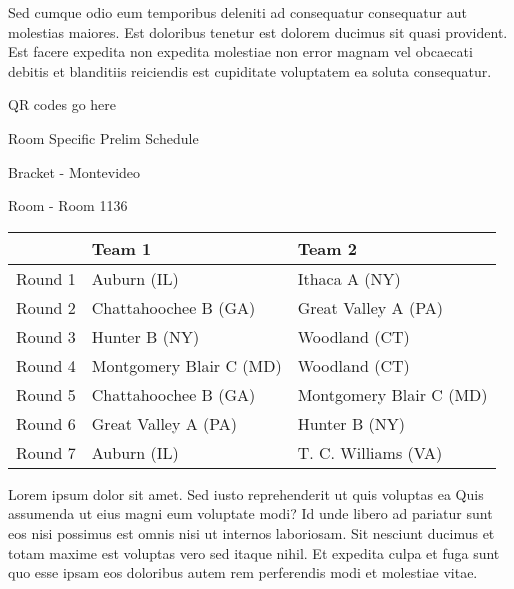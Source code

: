 \documentclass{article}%
\begin{document}
\newline%
Sed cumque odio eum temporibus deleniti ad consequatur consequatur aut molestias maiores. Est doloribus tenetur est dolorem ducimus sit quasi provident. Est facere expedita non expedita molestiae non error magnam vel obcaecati debitis et blanditiis reiciendis est cupiditate voluptatem ea soluta consequatur.%
\vspace*{140pt}%
\begin{center}%
\begin{Huge}%
QR codes go here%
\end{Huge}%
\end{center}%
\newpage%
\begin{center}%
\begin{Huge}%
Room Specific Prelim Schedule%
\end{Huge}%
\vspace*{8pt}%
\linebreak%
\begin{Large}%
Bracket {-} Montevideo%
\end{Large}%
\vspace*{8pt}%
\linebreak%
\vspace*{8pt}%
\begin{Large}%
Room {-} Room 1136%
\end{Large}%
\end{center}%
%
\begin{tabularx}{\textwidth}{|c|Y|Y|}%
\hline%
&Team 1&Team 2\\%
\hline%
Round 1&Auburn (IL)&Ithaca A (NY)\\%
Round 2&Chattahoochee B (GA)&Great Valley A (PA)\\%
Round 3&Hunter B (NY)&Woodland (CT)\\%
Round 4&Montgomery Blair C (MD)&Woodland (CT)\\%
Round 5&Chattahoochee B (GA)&Montgomery Blair C (MD)\\%
Round 6&Great Valley A (PA)&Hunter B (NY)\\%
Round 7&Auburn (IL)&T. C. Williams (VA)\\%
\hline%
\end{tabularx}%
\vspace*{8pt}%
\newline%
Lorem ipsum dolor sit amet. Sed iusto reprehenderit ut quis voluptas ea Quis assumenda ut eius magni eum voluptate modi? Id unde libero ad pariatur sunt eos nisi possimus est omnis nisi ut internos laboriosam. Sit nesciunt ducimus et totam maxime est voluptas vero sed itaque nihil. Et expedita culpa et fuga sunt quo esse ipsam eos doloribus autem rem perferendis modi et molestiae vitae.\newline%
\end{document}
